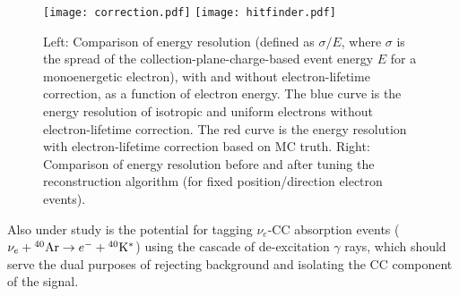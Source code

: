%
\begin{figure}[!htb] %
 \centering
\texttt{[image: correction.pdf]} 
\texttt{[image: hitfinder.pdf]} 

 \caption[Comparisons of energy resolution]{Left: Comparison of energy
   resolution (defined as $\sigma/E$, where $\sigma$ is the spread of
   the collection-plane-charge-based event energy $E$ for a
   monoenergetic electron), with and without electron-lifetime
   correction, as a function of electron energy. The blue curve is the
   energy resolution of isotropic and uniform electrons without
   electron-lifetime correction. The red curve is the energy
   resolution with electron-lifetime correction based on MC truth.
   Right: Comparison of energy resolution before and after tuning the
   reconstruction algorithm (for fixed position/direction electron
   events).}\label{fig:lowe_res}
\end{figure}


Also under study is the potential for tagging $\nu_e$-CC absorption
events ($\nu_e +{}^{40}{\rm Ar} \rightarrow e^- +{}^{40}{\rm
  K^*}$) using the cascade of de-excitation $\gamma$ rays, which should
serve the dual purposes of rejecting background and isolating the CC
component of the signal.  


